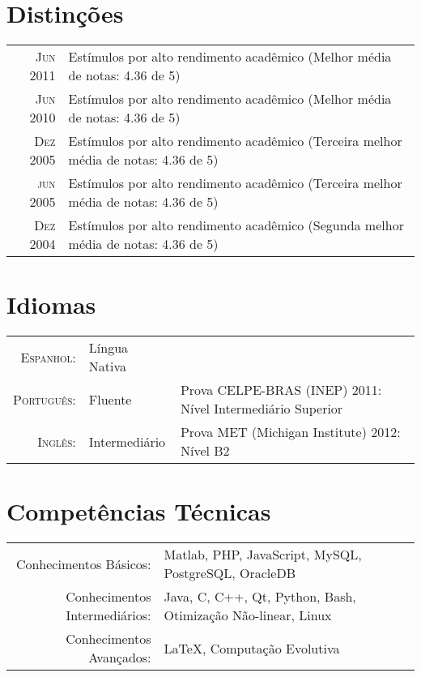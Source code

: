 \documentclass[a4paper,10pt]{article}
\begin{document}
\section{Distinções}
\begin{tabular}{rl}

  \textsc{Jun 2011} & Estímulos por alto rendimento acadêmico \footnotesize(Melhor média de notas: 4.36 de 5)\normalsize\\
  \textsc{Jun 2010} & Estímulos por alto rendimento acadêmico \footnotesize(Melhor média de notas: 4.36 de 5)\normalsize\\
  \textsc{Dez 2005} & Estímulos por alto rendimento acadêmico \footnotesize(Terceira melhor média de notas: 4.36 de 5)\normalsize\\
  \textsc{jun 2005} & Estímulos por alto rendimento acadêmico \footnotesize(Terceira melhor média de notas: 4.36 de 5)\normalsize\\
  \textsc{Dez 2004} & Estímulos por alto rendimento acadêmico \footnotesize(Segunda melhor média de notas: 4.36 de 5)\normalsize\\

\end{tabular}

\section{Idiomas}
\begin{tabular}{rll}

  \textsc{Espanhol:}    & Língua Nativa     & \\
  \textsc{Português:}   & Fluente           & Prova \textsc{CELPE-BRAS} (INEP) 2011: Nível Intermediário Superior\\
  \textsc{Inglês:}      & Intermediário     & Prova \textsc{MET} (Michigan Institute) 2012: Nível B2 \\

\end{tabular}

\section{Competências Técnicas}
\begin{tabular}{rl}

  Conhecimentos Básicos:        & Matlab, PHP, JavaScript, MySQL, PostgreSQL, OracleDB \\
  Conhecimentos Intermediários: & Java, C, C++, Qt, Python, Bash, Otimização Não-linear, Linux\\
  Conhecimentos Avançados:      & \LaTeX, Computação Evolutiva 

\end{tabular}
\end{document}
